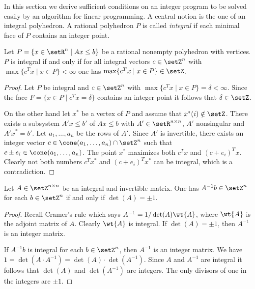 In this section we derive sufficient conditions on an integer program
to be solved easily by an algorithm for linear programming. A central
notion is the one of an integral polyhedron. A rational polyhedron $P$
is called \emph{integral} if each minimal face  of $P$ contains an
integer point.  

\begin{theorem}
  \label{po:thr:5}
  Let $P = \{x \in \setR^n \mid Ax\leq b\}$  be a rational nonempty  polyhedron with
  vertices. $P$ is integral if and only if for all integral vectors $c
  \in \setZ^n$ with $\max\{c^Tx \mid x \in P\}<\infty$ one has $\max\{c^Tx \mid x
  \in P\} \in \setZ$. 
\end{theorem}

\begin{proof}
  Let $P$ be integral and $c \in \setZ^n$ with
  $\max\{c^Tx\mid x\in P\}=\delta<\infty$. Since the face    $F=\{x\in P\mid c^Tx=\delta\}$
  contains an integer point it follows   that $\delta\in\setZ$.  

  On the other hand let $x^*$ be a vertex of $P$ and assume that $x^*(i) \notin
  \setZ$. There exists a subsystem $A'x\leq b'$ of $Ax\leq b$ with $A'\in\setR^{n\times n}$,
  $A'$ nonsingular and $A'x^*=b'$. Let $a_1,\ldots,a_n$ be the rows of
  $A'$. Since $A'$ is invertible, there exists an integer vector $c \in
  \cone(a_1,\ldots,a_n)\cap\setZ^n$ such that $c\pm e_i \in
  \cone(a_1,\ldots,a_n)$. The point $x^*$ maximizes both $c^Tx$ and
  $(c+e_i)^Tx$. Clearly not both numbers $c^Tx^*$ and
  $(c+e_i)^Tx^*$ can be integral, which is a contradiction. 
\end{proof}



\begin{lemma}
  \label{po:lem:6}
  Let $A\in \setZ^{n\times n}$ be an integral and invertible matrix. One has
  $A^{-1}b \in \setZ^n$ for each $b \in \setZ^n$ if and only if $\det(A)=\pm 1$.
\end{lemma}


\begin{proof}
  Recall Cramer's rule which says $A^{-1} = 1/\det(A) \wt{A}$, where
  $\wt{A}$ is the adjoint matrix of $A$. Clearly $\wt{A}$ is
  integral. If $\det(A) = \pm 1$, then $A^{-1}$ is an integer matrix. 

  If $A^{-1}b$ is integral for each $b \in \setZ^n$, then $A^{-1}$ is an
  integer matrix. We have $1=\det(A\cdot A^{-1})=\det(A)\cdot\det(A^{-1})$.
  Since $A$ and $A^{-1}$ are integral it follows that $\det(A)$ and
  $\det(A^{-1})$ are integers. The only divisors of one in the integers
  are $\pm 1$. 
\end{proof}



